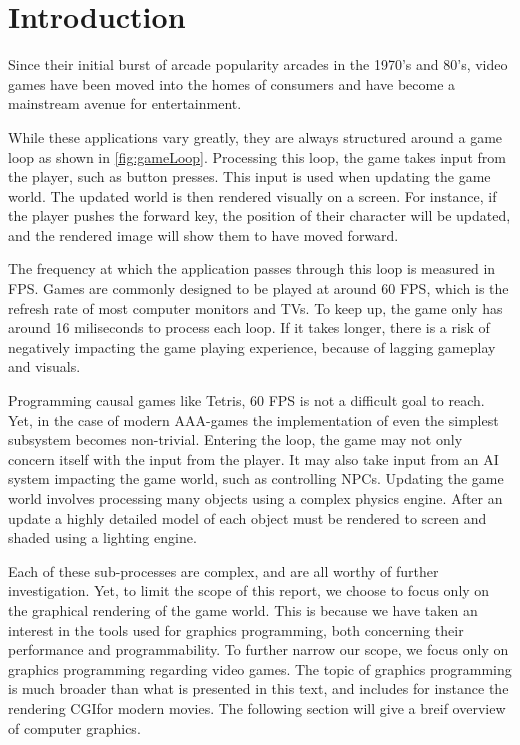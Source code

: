 \chapter{Introduction}\label{ch:introduction} 
Since their initial burst of arcade popularity arcades in the 1970’s and 80’s, video games have been moved into the homes of consumers and have become a mainstream avenue for entertainment.
 
While these applications vary greatly, they are always structured around a game loop as shown in \cref{fig:gameLoop}. 
Processing this loop, the game takes input from the player, such as button presses. 
This input is used when updating the game world. 
The updated world is then rendered visually on a screen. 
For instance, if the player pushes the forward key, the position of their character will be updated, and the rendered image will show them to have moved forward. 


The frequency at which the application passes through this loop is measured in \gls{FPS}.
Games are commonly designed to be played at around 60 \gls{FPS}, which is the refresh rate of most computer monitors and TVs.
To keep up, the game only has around 16 miliseconds to process each loop.
If it takes longer, there is a risk of negatively impacting the game playing experience, because of lagging gameplay and visuals.
 
Programming causal games like Tetris, 60 \gls{FPS} is not a difficult goal to reach.
Yet, in the case of modern AAA-games the implementation of even the simplest subsystem becomes non-trivial.
Entering the loop, the game may not only concern itself with the input from the player.
It may also take input from an \gls{AI} system impacting the game world, such as controlling \glspl{NPC}. 
Updating the game world involves processing many objects using a complex physics engine. 
After an update a highly detailed model of each object must be rendered to screen and shaded using a lighting engine.  
 
Each of these sub-processes are complex, and are all worthy of further investigation.
Yet, to limit the scope of this report, we choose to focus only on the graphical rendering of the game world.
This is because we have taken an interest in the tools used for graphics programming, both concerning their performance and programmability.
To further narrow our scope, we focus only on graphics programming regarding video games.
The topic of graphics programming is much broader than what is presented in this text, and includes for instance the rendering \gls{CGI}for modern movies. 
The following section will give a breif overview of computer graphics.

